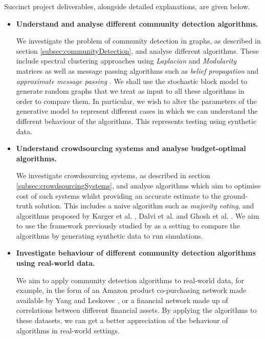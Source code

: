 \documentclass[12pt]{article}
\numberwithin{equation}{section}
\begin{document}
Succinct project deliverables, alongside detailed explanations, are given below.
\begin{itemize}
	\item \textbf{Understand and analyse different community detection algorithms.}

	We investigate the problem of community detection in graphs, as described in section \ref{subsec:communityDetection}, and analyse different algorithms. These include spectral clustering approaches using \textit{Laplacian} \cite{Spi07,Spi12} and \textit{Modularity} \cite{New06a,New06b} matrices as well as message passing algorithms such as \textit{belief propagation} \cite{DKM+13} and \textit{approximate message passing} \cite{BM11}. We shall use the stochastic block model to generate random graphs that we treat as input to all these algorithms in order to compare them. In particular, we wish to alter the parameters of the generative model to represent different cases in which we can understand the different behaviour of the algorithms. This represents testing using synthetic data.

	\item \textbf{Understand crowdsourcing systems and analyse budget-optimal algorithms.}

	We investigate crowdsourcing systems, as described in section \ref{subsec:crowdsourcingSystems}, and analyse algorithms which aim to optimise cost of such systems whilst providing an accurate estimate to the ground-truth solution. This includes a naive algorithm such as \textit{majority voting}, and algorithms proposed by Karger et al. \cite{KOS13}, Dalvi et al. \cite{DDK+13} and Ghosh et al. \cite{GKM11}. We aim to use the framework previously studied by \cite{KOS13,DDK+13} as a setting to compare the algorithms by generating synthetic data to run simulations.

	\item \textbf{Investigate behaviour of different community detection algorithms using real-world data.}

	We aim to apply community detection algorithms to real-world data, for example, in the form of an Amazon product co-purchasing network made available by Yang and Leskovec \cite{YL12}, or a financial network made up of correlations between different financial assets. By applying the algorithms to these datasets, we can get a better appreciation of the behaviour of algorithms in real-world settings.
\end{itemize}

\end{document}
